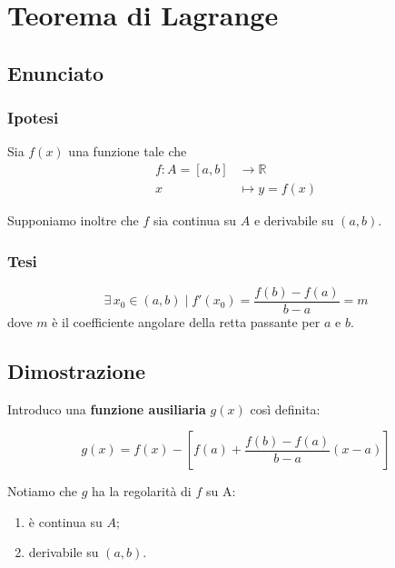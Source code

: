 \documentclass[../../dimostrazioni]{subfiles}
\begin{document}
    \chapter{Teorema di Lagrange}
    \label{teoLagrange}

        \section*{Enunciato}

            \subsection*{Ipotesi}

                Sia \(f(x)\) una funzione tale che
                \begin{align*}
                    f : A = [a, b] &\longrightarrow \mathbb{R}\\
                    x &\longmapsto y = f(x) 
                \end{align*}

                Supponiamo inoltre che \(f\) sia continua su \(A\) e derivabile su \((a, b)\).

            \subsection*{Tesi}

                \[ \exists \, x_0 \in (a,b) \; | \; f'(x_0) = \frac{f(b)-f(a)}{b-a}=m \]
                dove \(m\) è il coefficiente angolare della retta passante per \(a\) e \(b\).

        \section*{Dimostrazione}

            Introduco una \textbf{funzione ausiliaria} \(g(x)\) così definita:

            \[ g(x) = f(x) - \left[f(a) + \frac{f(b) - f(a)}{b - a}(x - a) \right] \]

            Notiamo che \(g\) ha la regolarità di \(f\) su A:
            \begin{enumerate}
                \indentitem \item è continua su \( A \);
                \indentitem \item derivabile su \( (a, b) \).
            \end{enumerate}
\end{document}
